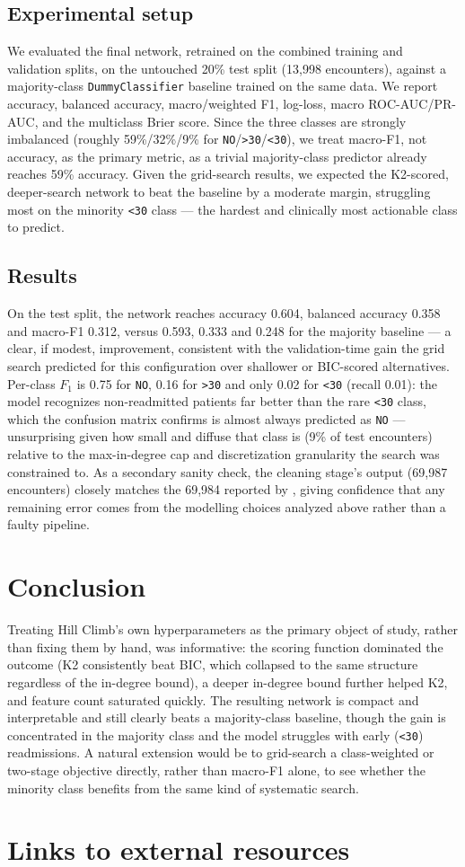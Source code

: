 \documentclass[letterpaper]{article}
\begin{document}
\subsection{Experimental setup}
We evaluated the final network, retrained on the combined training and validation splits, on the untouched 20\% test split (13{,}998 encounters), against a majority-class \texttt{DummyClassifier} baseline trained on the same data. We report accuracy, balanced accuracy, macro/weighted F1, log-loss, macro ROC-AUC/PR-AUC, and the multiclass Brier score. Since the three classes are strongly imbalanced (roughly 59\%/32\%/9\% for \texttt{NO}/\texttt{>30}/\texttt{<30}), we treat macro-F1, not accuracy, as the primary metric, as a trivial majority-class predictor already reaches 59\% accuracy. Given the grid-search results, we expected the K2-scored, deeper-search network to beat the baseline by a moderate margin, struggling most on the minority \texttt{<30} class — the hardest and clinically most actionable class to predict.

\subsection{Results}
On the test split, the network reaches accuracy 0.604, balanced accuracy 0.358 and macro-F1 0.312, versus 0.593, 0.333 and 0.248 for the majority baseline — a clear, if modest, improvement, consistent with the validation-time gain the grid search predicted for this configuration over shallower or BIC-scored alternatives. Per-class $F_1$ is 0.75 for \texttt{NO}, 0.16 for \texttt{>30} and only 0.02 for \texttt{<30} (recall 0.01): the model recognizes non-readmitted patients far better than the rare \texttt{<30} class, which the confusion matrix confirms is almost always predicted as \texttt{NO} — unsurprising given how small and diffuse that class is (9\% of test encounters) relative to the max-in-degree cap and discretization granularity the search was constrained to. As a secondary sanity check, the cleaning stage's output (69{,}987 encounters) closely matches the 69{,}984 reported by \cite{strack2014impact}, giving confidence that any remaining error comes from the modelling choices analyzed above rather than a faulty pipeline.

\section{Conclusion}
Treating Hill Climb's own hyperparameters as the primary object of study, rather than fixing them by hand, was informative: the scoring function dominated the outcome (K2 consistently beat BIC, which collapsed to the same structure regardless of the in-degree bound), a deeper in-degree bound further helped K2, and feature count saturated quickly. The resulting network is compact and interpretable and still clearly beats a majority-class baseline, though the gain is concentrated in the majority class and the model struggles with early (\texttt{<30}) readmissions. A natural extension would be to grid-search a class-weighted or two-stage objective directly, rather than macro-F1 alone, to see whether the minority class benefits from the same kind of systematic search.


\section{Links to external resources}


\bigskip



\end{document}
